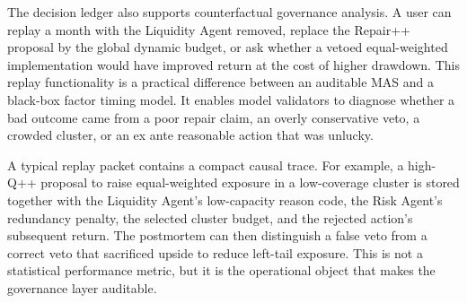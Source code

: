 \documentclass[sigconf,nonacm]{acmart}
\begin{document}
The decision ledger also supports counterfactual governance analysis. A user can replay a month with the Liquidity Agent removed, replace the Repair++ proposal by the global dynamic budget, or ask whether a vetoed equal-weighted implementation would have improved return at the cost of higher drawdown. This replay functionality is a practical difference between an auditable MAS and a black-box factor timing model. It enables model validators to diagnose whether a bad outcome came from a poor repair claim, an overly conservative veto, a crowded cluster, or an ex ante reasonable action that was unlucky.

A typical replay packet contains a compact causal trace. For example, a high-Q++ proposal to raise equal-weighted exposure in a low-coverage cluster is stored together with the Liquidity Agent's low-capacity reason code, the Risk Agent's redundancy penalty, the selected cluster budget, and the rejected action's subsequent return. The postmortem can then distinguish a false veto from a correct veto that sacrificed upside to reduce left-tail exposure. This is not a statistical performance metric, but it is the operational object that makes the governance layer auditable.

\begin{table}[t]
\centering
\caption{Deployability proxies. Turnover and switching are alpha-library proxies; EW exposure measures implementation-channel fragility.}
\label{tab:deploy}
\tiny
\setlength{\tabcolsep}{2.0pt}
\end{table}
\end{document}
